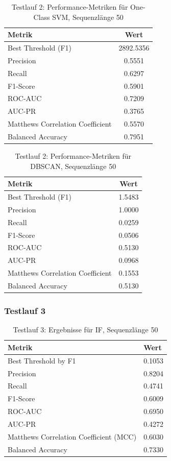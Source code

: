 \documentclass[a4paper,12pt]{article}
\begin{document}
\begin{table}[H]
	\centering
	\begin{tabular}{l c}
		\toprule
		\textbf{Metrik} & \textbf{Wert} \\
		\midrule
		Best Threshold (F1) & 2892.5356 \\
		Precision & 0.5551 \\
		Recall & 0.6297 \\
		F1-Score & 0.5901 \\
		ROC-AUC & 0.7209 \\
		AUC-PR & 0.3765 \\
		Matthews Correlation Coefficient & 0.5570 \\
		Balanced Accuracy & 0.7951 \\
		\bottomrule
	\end{tabular}
	\caption{Testlauf 2: Performance-Metriken für One-Class SVM, Sequenzlänge 50}
\end{table}

\begin{table}[H]
	\centering
	\begin{tabular}{l c}
		\toprule
		\textbf{Metrik} & \textbf{Wert} \\
		\midrule
		Best Threshold (F1) & 1.5483 \\
		Precision & 1.0000 \\
		Recall & 0.0259 \\
		F1-Score & 0.0506 \\
		ROC-AUC & 0.5130 \\
		AUC-PR & 0.0968 \\
		Matthews Correlation Coefficient & 0.1553 \\
		Balanced Accuracy & 0.5130 \\
		\bottomrule
	\end{tabular}
	\caption{Testlauf 2: Performance-Metriken für DBSCAN, Sequenzlänge 50}
\end{table}

\subsubsection{Testlauf 3}

\begin{table}[H]
	\centering
	\begin{tabular}{ll}
		\toprule
		\textbf{Metrik} & \textbf{Wert} \\
		\midrule
		Best Threshold by F1 & 0.1053 \\
		Precision & 0.8204 \\
		Recall & 0.4741 \\
		F1-Score & 0.6009 \\
		ROC-AUC & 0.6950 \\
		AUC-PR & 0.4272 \\
		Matthews Correlation Coefficient (MCC) & 0.6030 \\
		Balanced Accuracy & 0.7330 \\
		\bottomrule
	\end{tabular}
	\caption{Testlauf 3: Ergebnisse für IF, Sequenzlänge 50}
\end{table}
\end{document}
